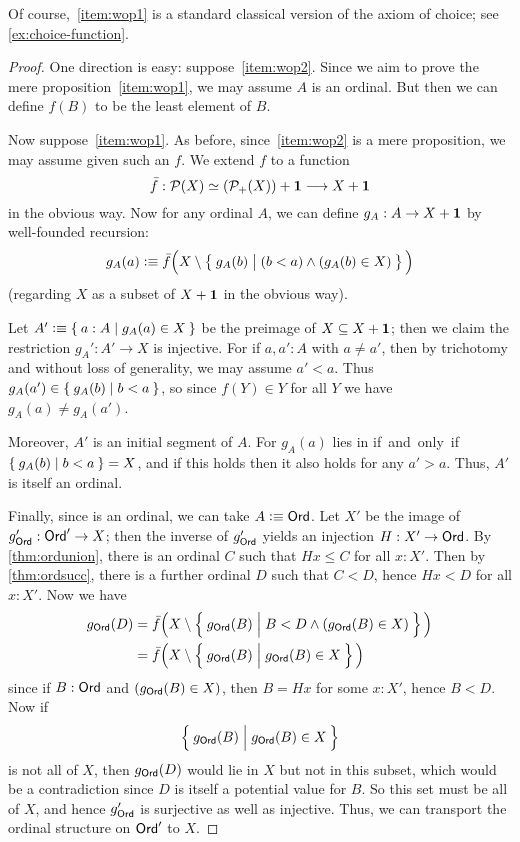 \noindent
Of course,~\ref{item:wop1} is a standard classical version of the axiom of choice; see \cref{ex:choice-function}.

\begin{proof}
  One direction is easy: suppose~\ref{item:wop2}.
  Since we aim to prove the mere proposition~\ref{item:wop1}, we may assume $A$ is an ordinal.
  But then we can define $f(B)$ to be the least element of $B$.

  Now suppose~\ref{item:wop1}.
  As before, since~\ref{item:wop2} is a mere proposition, we may assume given such an $f$.
  We extend $f$ to a function
  \[ \bar f:\mathcal{P}(X) \simeq (\mathcal{P}_+(X)) + \mathbf{1} \longrightarrow X+\mathbf{1}
  \]
  in the obvious way.
  Now for any ordinal $A$, we can define $g_A:A\to X+\mathbf{1}$ by well-founded recursion:
  \[ g_A(a) \vcentcolon\equiv
    \bar f\Big(X \setminus \Set{ g_A(b) | \strut (b<a) \wedge (g_A(b) \in X) }\Big)
  \]
  (regarding $X$ as a subset of $X+\mathbf{1}$ in the obvious way).

  Let $A'\vcentcolon\equiv \Set{a:A | g_A(a) \in X}$ be the preimage of $X\subseteq X+\mathbf{1}$; then we claim the restriction $g_A':A' \to X$ is injective.
  For if $a,a':A$ with $a\neq a'$, then by trichotomy and without loss of generality, we may assume $a'<a$.
  Thus $g_A(a') \in \Set{ g_A(b) | b<a }$, so since $f(Y)\in Y$ for all $Y$ we have $g_A(a) \neq g_A(a')$.

  Moreover, $A'$ is an initial segment of $A$.
  For $g_A(a)$ lies in \unit if and only if $\Set{g_A(b)|b<a} = X$, and if this holds then it also holds for any $a'>a$.
  Thus, $A'$ is itself an ordinal.

  Finally, since \ord is an ordinal, we can take $A\vcentcolon\equiv\mathsf{Ord}$.
  Let $X'$ be the image of $g_\mathsf{Ord}':\mathsf{Ord}' \to X$; then the inverse of $g_\mathsf{Ord}'$ yields an injection $H:X'\to \mathsf{Ord}$.
  By \cref{thm:ordunion}, there is an ordinal $C$ such that $Hx\le C$ for all $x:X'$.
  Then by \cref{thm:ordsucc}, there is a further ordinal $D$ such that $C<D$, hence $Hx<D$ for all $x:X'$.
  Now we have
  \begin{align*}
    g_{\ord}(D) &= \bar f\Big( X \setminus \setof{ g_\ord(B) | \rule{0pt}{1em} B<D \wedge (g_\ord(B) \in X)} \Big)\\
    &=\bar f\Big( X \setminus \setof{ g_\ord(B) | \rule{0pt}{1em} g_\ord(B) \in X} \Big)
  \end{align*}
  since if $B:\mathsf{Ord}$ and $(g_\mathsf{Ord}(B) \in X)$, then $B = Hx$ for some $x:X'$, hence $B<D$.
  Now if
  \[\setof{ g_\ord(B) | \rule{0pt}{1em} g_\ord(B) \in X}\]
  is not all of $X$, then $g_\mathsf{Ord}(D)$ would lie in $X$ but not in this subset, which would be a contradiction since $D$ is itself a potential value for $B$.
  So this set must be all of $X$, and hence $g_\mathsf{Ord}'$ is surjective as well as injective.
  Thus, we can transport the ordinal structure on $\mathsf{Ord}'$ to $X$.
\end{proof}

